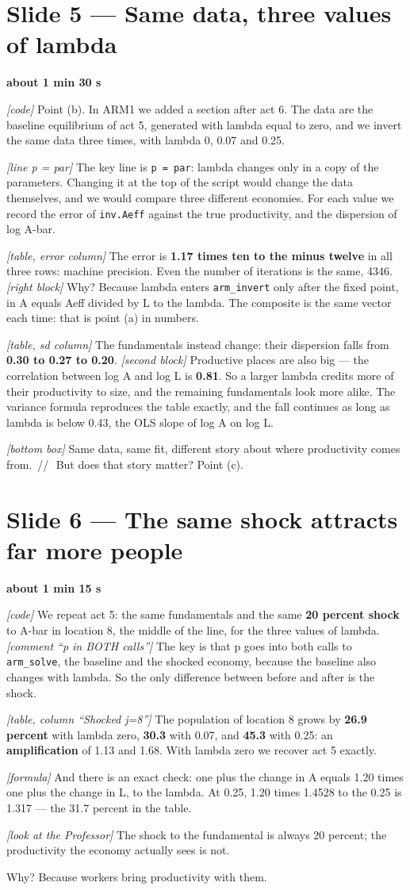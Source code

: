 \documentclass[11pt,a4paper]{article}
\newcommand{\slide}[2]{\Needspace{10\baselineskip}\section{#1}\textcolor{unicared}{\small\bfseries #2}\par}
\newcommand{\cue}[1]{{\small\itshape\color{unicared}[#1]}}
\newcommand{\pause}{\textcolor{unicared}{\,/\!/\,}}
\begin{document}
\slide{Slide 5 --- Same data, three values of lambda}{about 1 min 30 s}
\begin{say}
\cue{code} Point (b). In ARM1 we added a section after act 6. The data are the baseline equilibrium of act 5, generated with lambda equal to zero, and we invert the same data three times, with lambda 0, 0.07 and 0.25.

\cue{line p = par} The key line is \texttt{p = par}: lambda changes only in a copy of the parameters. Changing it at the top of the script would change the data themselves, and we would compare three different economies. For each value we record the error of \texttt{inv.Aeff} against the true productivity, and the dispersion of log A-bar.

\cue{table, error column} The error is \textbf{1.17 times ten to the minus twelve} in all three rows: machine precision. Even the number of iterations is the same, 4346. \cue{right block} Why? Because lambda enters \texttt{arm\_invert} only after the fixed point, in A equals Aeff divided by L to the lambda. The composite is the same vector each time: that is point (a) in numbers.

\cue{table, sd column} The fundamentals instead change: their dispersion falls from \textbf{0.30 to 0.27 to 0.20}. \cue{second block} Productive places are also big --- the correlation between log A and log L is \textbf{0.81}. So a larger lambda credits more of their productivity to size, and the remaining fundamentals look more alike. The variance formula reproduces the table exactly, and the fall continues as long as lambda is below 0.43, the OLS slope of log A on log L.

\cue{bottom box} Same data, same fit, different story about where productivity comes from. \pause\ But does that story matter? Point (c).
\end{say}

\slide{Slide 6 --- The same shock attracts far more people}{about 1 min 15 s}
\begin{say}
\cue{code} We repeat act 5: the same fundamentals and the same \textbf{20 percent shock} to A-bar in location 8, the middle of the line, for the three values of lambda. \cue{comment ``p in BOTH calls''} The key is that p goes into both calls to \texttt{arm\_solve}, the baseline and the shocked economy, because the baseline also changes with lambda. So the only difference between before and after is the shock.

\cue{table, column ``Shocked j=8''} The population of location 8 grows by \textbf{26.9 percent} with lambda zero, \textbf{30.3} with 0.07, and \textbf{45.3} with 0.25: an \textbf{amplification} of 1.13 and 1.68. With lambda zero we recover act 5 exactly.

\cue{formula} And there is an exact check: one plus the change in A equals 1.20 times one plus the change in L, to the lambda. At 0.25, 1.20 times 1.4528 to the 0.25 is 1.317 --- the 31.7 percent in the table.

\cue{look at the Professor} The shock to the fundamental is always 20 percent; the productivity the economy actually sees is not.

Why? Because workers bring productivity with them.
\end{say}
\end{document}
